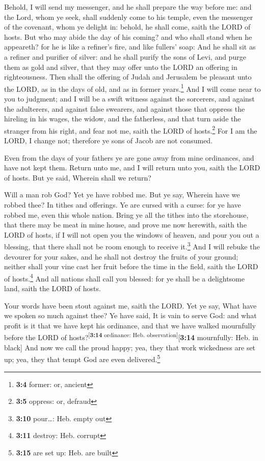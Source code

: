  Behold, I will send my messenger, and he shall prepare
the way before me: and the Lord, whom ye seek, shall suddenly come to
his temple, even the messenger of the covenant, whom ye delight in:
behold, he shall come, saith the LORD of hosts.  But who
may abide the day of his coming? and who shall stand when he appeareth?
for he is like a refiner's fire, and like fullers' soap: 
And he shall sit as a refiner and purifier of silver: and he shall
purify the sons of Levi, and purge them as gold and silver, that they
may offer unto the LORD an offering in righteousness. 
Then shall the offering of Judah and Jerusalem be pleasant unto the
LORD, as in the days of old, and as in former years.\footnote{\textbf{3:4}
  former: or, ancient}  And I will come near to you to
judgment; and I will be a swift witness against the sorcerers, and
against the adulterers, and against false swearers, and against those
that oppress the hireling in his wages, the widow, and the fatherless,
and that turn aside the stranger from his right, and fear not me, saith
the LORD of hosts.\footnote{\textbf{3:5} oppress: or, defraud}
 For I am the LORD, I change not; therefore ye sons of
Jacob are not consumed.

 Even from the days of your fathers ye are gone away from
mine ordinances, and have not kept them. Return unto me, and I will
return unto you, saith the LORD of hosts. But ye said, Wherein shall we
return?

 Will a man rob God? Yet ye have robbed me. But ye say,
Wherein have we robbed thee? In tithes and offerings.  Ye
are cursed with a curse: for ye have robbed me, even this whole nation.
 Bring ye all the tithes into the storehouse, that there
may be meat in mine house, and prove me now herewith, saith the LORD of
hosts, if I will not open you the windows of heaven, and pour you out a
blessing, that there shall not be room enough to receive it.\footnote{\textbf{3:10}
  pour\ldots: Heb. empty out}  And I will rebuke the
devourer for your sakes, and he shall not destroy the fruits of your
ground; neither shall your vine cast her fruit before the time in the
field, saith the LORD of hosts.\footnote{\textbf{3:11} destroy: Heb.
  corrupt}  And all nations shall call you blessed: for
ye shall be a delightsome land, saith the LORD of hosts.

 Your words have been stout against me, saith the LORD.
Yet ye say, What have we spoken so much against thee?  Ye
have said, It is vain to serve God: and what profit is it that we have
kept his ordinance, and that we have walked mournfully before the LORD
of hosts?\textsuperscript{{[}\textbf{3:14} ordinance: Heb.
observation{]}}{[}\textbf{3:14} mournfully: Heb. in black{]}
 And now we call the proud happy; yea, they that work
wickedness are set up; yea, they that tempt God are even
delivered.\footnote{\textbf{3:15} are set up: Heb. are built}

